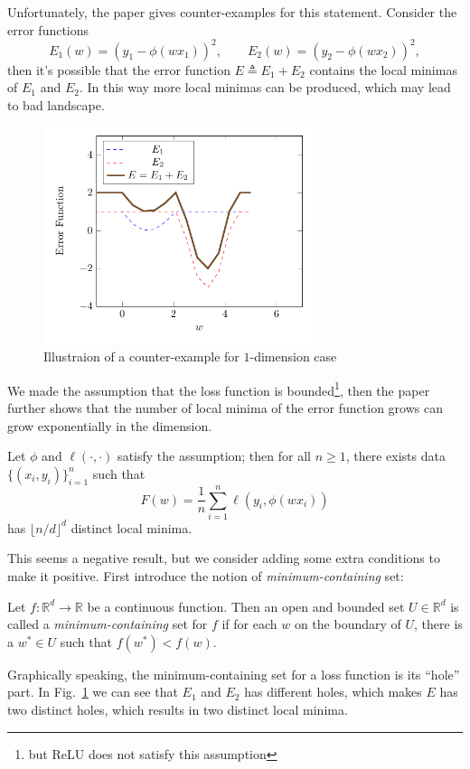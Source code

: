 Unfortunately, 
the paper \citep{NIPS19951028} gives counter-examples for this statement.
Consider the error functions 
\[
E_1(w)=(y_1 - \phi(wx_1))^2,\qquad
E_2(w)=(y_2 - \phi(wx_2))^2,
\]
then it's possible that the error function $E\triangleq E_1+E_2$ contains the local minimas of $E_1$ and $E_2$. In this way more local minimas can be produced, which may lead to bad landscape.
\begin{figure}[H]
\centering
\includegraphics[width=0.7\textwidth]{Sixth_lecture/f_3}
\caption{Illustraion of a counter-example for $1$-dimension case}
\label{fig:6:1}
\end{figure}
We made the assumption that the loss function is bounded\footnote{but ReLU does not satisfy this assumption}, then the paper \citep{NIPS19951028} further shows that the number of local minima of the error function grows can grow exponentially in the dimension. 
\begin{theorem}
Let $\phi$ and $\ell(\cdot,\cdot)$ satisfy the assumption;
then for all $n\ge1$, there exists data $\{(x_i,y_i)\}_{i=1}^n$ such that 
\[
F(w) = \frac{1}{n}\sum_{i=1}^n\ell(y_i,\phi(wx_i))
\]
has $\lfloor n/d\rfloor^d$ distinct local minima.
\end{theorem}
This seems a negative result, but we consider adding some extra conditions to make it positive.
First introduce the notion of \emph{minimum-containing} set:
\begin{definition}
Let $f:\mathbb{R}^d\to\mathbb{R}$ be a continuous function. 
Then an open and bounded set $U\in\mathbb{R}^d$ is called a \emph{minimum-containing} set for $f$ 
if for each $w$ on the boundary of $U$, there
is a $w^*\in U$ such that $f(w^*)<f(w)$.
\end{definition}
Graphically speaking, the minimum-containing set for a loss function is its ``hole'' part. In Fig.~\ref{fig:6:1} we can see that $E_1$ and $E_2$ has different holes, which makes $E$ has two distinct holes, which results in two distinct local minima.

